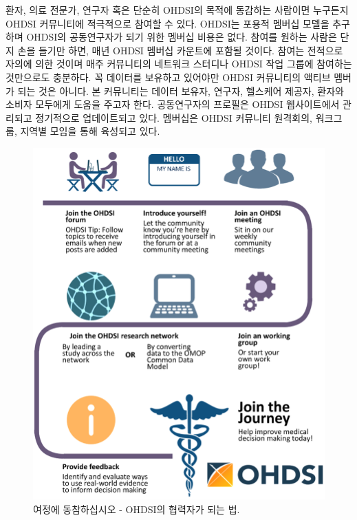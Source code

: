 \documentclass[10.5pt]{book}
\theoremstyle{definition}
\theoremstyle{definition}
\theoremstyle{definition}
\theoremstyle{remark}
\begin{document}
환자, 의료 전문가, 연구자 혹은 단순히 OHDSI의 목적에 동감하는 사람이면
누구든지 OHDSI 커뮤니티에 적극적으로 참여할 수 있다. OHDSI는 포용적
멤버십 모델을 추구하며 OHDSI의 공동연구자가 되기 위한 멤버십 비용은
없다. 참여를 원하는 사람은 단지 손을 들기만 하면, 매년 OHDSI 멤버십
카운트에 포함될 것이다. 참여는 전적으로 자의에 의한 것이며 매주
커뮤니티의 네트워크 스터디나 OHDSI 작업 그룹에 참여하는 것만으로도
충분하다. 꼭 데이터를 보유하고 있어야만 OHDSI 커뮤니티의 액티브 멤버가
되는 것은 아니다. 본 커뮤니티는 데이터 보유자, 연구자, 헬스케어 제공자,
환자와 소비자 모두에게 도움을 주고자 한다. 공동연구자의 프로필은 OHDSI
웹사이트에서 관리되고 정기적으로 업데이트되고 있다. 멤버십은 OHDSI
커뮤니티 원격회의, 워크그룹, 지역별 모임을 통해 육성되고 있다.
  

\begin{figure}

{\centering \includegraphics[width=0.9\linewidth]{images/WhereToBegin/joinTheJourney} 

}

\caption{여정에 동참하십시오 - OHDSI의 협력자가 되는 법.}\label{fig:jointhejourney}
\end{figure}
\end{document}
